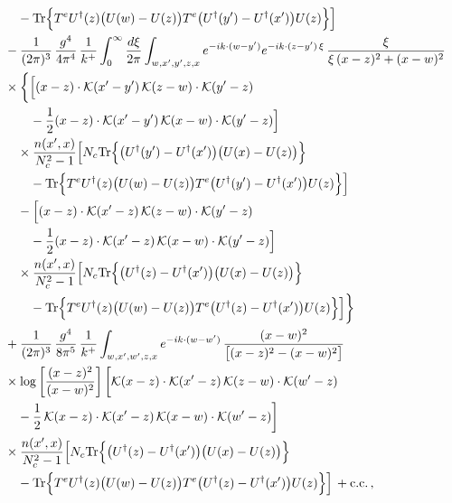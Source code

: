 \begin{align}
&\quad\quad -{\rm Tr}\Big\{T^{e}U^{\dagger}(z)\big(U(w)-U(z)\big)T^{e}\big(U^{\dagger}(y')-U^{\dagger}(x')\big)U(z)\Big\}\Big]\notag\\
&\quad -\frac{1}{(2\pi)^{3}}\, \frac{g^{4}}{4\pi^{4}}\, \frac{1}{k^{+}} \int_{0}^{\infty}\frac{d\xi}{2\pi} \int_{w,x',y',z,x}e^{-ik\cdot(w-y')}e^{-ik\cdot(z-y')\,\xi}\, \frac{\xi}{\xi\,(x-z)^{2}+(x-w)^{2}}\notag\\
&\quad \times\bigg\{\Big[(x-z)\cdot\mathcal{K}(x'-y')\, \mathcal{K}(z-w)\cdot\mathcal{K}(y'-z)\notag\\
&\quad\quad\quad -\frac{1}{2}(x-z)\cdot\mathcal{K}(x'-y')\, \mathcal{K}(x-w)\cdot\mathcal{K}(y'-z)\Big]\notag\\
&\quad\quad \times\frac{n(x',x)}{N_{c}^{2}-1}\Big[N_{c}{\rm Tr}\Big\{\big(U^{\dagger}(y')-U^{\dagger}(x')\big)\big(U(x)-U(z)\big)\Big\}\notag\\
&\quad\quad\quad -{\rm Tr}\Big\{T^{e}U^{\dagger}(z)\big(U(w)-U(z)\big)T^{e}\big(U^{\dagger}(y')-U^{\dagger}(x')\big)U(z)\Big\}\Big]\notag\\
&\quad\quad -\Big[(x-z)\cdot\mathcal{K}(x'-z)\, \mathcal{K}(z-w)\cdot\mathcal{K}(y'-z)\notag\\
&\quad\quad\quad -\frac{1}{2}(x-z)\cdot\mathcal{K}(x'-z)\, \mathcal{K}(x-w)\cdot\mathcal{K}(y'-z)\Big]\notag\\
&\quad\quad \times\frac{n(x',x)}{N_{c}^{2}-1}\Big[N_{c}{\rm Tr}\Big\{\big(U^{\dagger}(z)-U^{\dagger}(x')\big)\big(U(x)-U(z)\big)\Big\}\notag\\
&\quad\quad\quad -{\rm Tr}\Big\{T^{e}U^{\dagger}(z)\big(U(w)-U(z)\big)T^{e}\big(U^{\dagger}(z)-U^{\dagger}(x')\big)U(z)\Big\}\Big]\bigg\}\notag\\
&\quad +\frac{1}{(2\pi)^{3}}\, \frac{g^{4}}{8\pi^{5}}\, \frac{1}{k^{+}} \int_{w,x',w',z,x}e^{-ik\cdot(w-w')}\, \frac{(x-w)^{2}}{\big[(x-z)^{2}-(x-w)^{2}\big]}\notag\\
&\quad \times \log\left[\frac{(x-z)^{2}}{(x-w)^{2}}\right] \bigg[\mathcal{K}(x-z)\cdot\mathcal{K}(x'-z)\, \mathcal{K}(z-w)\cdot\mathcal{K}(w'-z)\notag\\
&\quad\quad -\frac{1}{2}\, \mathcal{K}(x-z)\cdot\mathcal{K}(x'-z)\, \mathcal{K}(x-w)\cdot\mathcal{K}(w'-z)\bigg]\notag\\
&\quad \times \frac{n(x',x)}{N_{c}^{2}-1}\Big[N_{c}{\rm Tr}\Big\{\big(U^{\dagger}(z)-U^{\dagger}(x')\big)\big(U(x)-U(z)\big)\Big\}\notag\\
&\quad\quad -{\rm Tr}\Big\{T^{e}U^{\dagger}(z)\big(U(w)-U(z)\big)T^{e}\big(U^{\dagger}(z)-U^{\dagger}(x')\big)U(z)\Big\}\Big]\, +{\rm c.c.}\, ,
\end{align}
